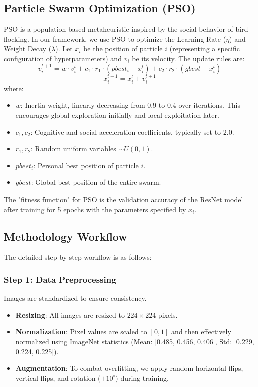 \documentclass[twocolumn,10pt,a4paper]{article}
\begin{document}
\subsection{Particle Swarm Optimization (PSO)}
PSO is a population-based metaheuristic inspired by the social behavior of bird flocking. In our framework, we use PSO to optimize the Learning Rate ($\eta$) and Weight Decay ($\lambda$).
Let $x_i$ be the position of particle $i$ (representing a specific configuration of hyperparameters) and $v_i$ be its velocity.
The update rules are:
\begin{equation}
v_{i}^{t+1} = w \cdot v_{i}^{t} + c_1 \cdot r_1 \cdot (pbest_i - x_{i}^{t}) + c_2 \cdot r_2 \cdot (gbest - x_{i}^{t})
\end{equation}
\begin{equation}
x_{i}^{t+1} = x_{i}^{t} + v_{i}^{t+1}
\end{equation}
where:
\begin{itemize}
    \item $w$: Inertia weight, linearly decreasing from 0.9 to 0.4 over iterations. This encourages global exploration initially and local exploitation later.
    \item $c_1, c_2$: Cognitive and social acceleration coefficients, typically set to 2.0.
    \item $r_1, r_2$: Random uniform variables $\sim U(0,1)$.
    \item $pbest_i$: Personal best position of particle $i$.
    \item $gbest$: Global best position of the entire swarm.
\end{itemize}
The "fitness function" for PSO is the validation accuracy of the ResNet model after training for 5 epochs with the parameters specified by $x_i$.

\subsection{Methodology Workflow}
The detailed step-by-step workflow is as follows:

\subsubsection{Step 1: Data Preprocessing}
Images are standardized to ensure consistency.
\begin{itemize}
    \item \textbf{Resizing}: All images are resized to $224 \times 224$ pixels.
    \item \textbf{Normalization}: Pixel values are scaled to $[0, 1]$ and then effectively normalized using ImageNet statistics (Mean: [0.485, 0.456, 0.406], Std: [0.229, 0.224, 0.225]).
    \item \textbf{Augmentation}: To combat overfitting, we apply random horizontal flips, vertical flips, and rotation ($\pm 10^\circ$) during training.
\end{itemize}
\end{document}
